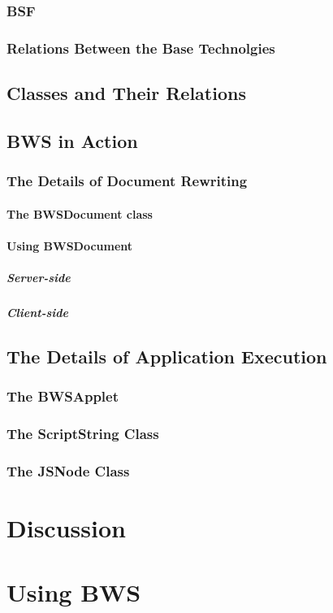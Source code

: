   \subsubsection{BSF}
  \subsubsection{Relations Between the Base Technolgies}
 \subsection{Classes and Their Relations}
 \subsection{BWS in Action}
  \subsubsection{The Details of Document Rewriting}
   \paragraph{The BWSDocument class}
   \paragraph{Using BWSDocument}
    \subparagraph{Server-side}
    \subparagraph{Client-side}
  \subsection{The Details of Application Execution}
   \subsubsection{The BWSApplet}
   \subsubsection{The ScriptString Class}
   \subsubsection{The JSNode Class}
\section{Discussion}

\section{Using BWS}

